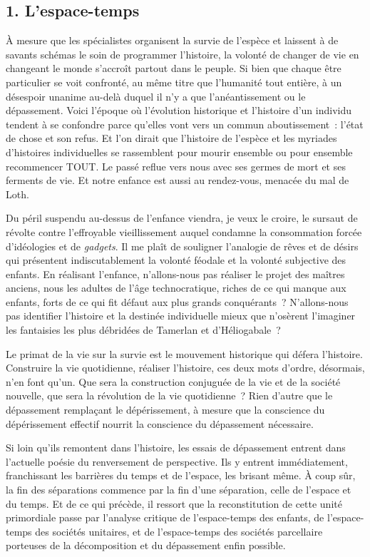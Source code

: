 \documentclass[french,twoside]{book} %
\begin{document}
\subsection[{1. L’espace-temps}]{\textsc{1.} L’espace-temps}
\noindent À mesure que les spécialistes organisent la survie de l’espèce et laissent à de savants schémas le soin de programmer l’histoire, la volonté de changer de vie en changeant le monde s’accroît partout dans le peuple. Si bien que chaque être particulier se voit confronté, au même titre que l’humanité tout entière, à un désespoir unanime au-delà duquel il n’y a que l’anéantissement ou le dépassement. Voici l’époque où l’évolution historique et l’histoire d’un individu tendent à se confondre parce qu’elles vont vers un commun aboutissement : l’état de chose et son refus. Et l’on dirait que l’histoire de l’espèce et les myriades d’histoires individuelles se rassemblent pour mourir ensemble ou pour ensemble recommencer TOUT. Le passé reflue vers nous avec ses germes de mort et ses ferments de vie. Et notre enfance est aussi au rendez-vous, menacée du mal de Loth.\par
Du péril suspendu au-dessus de l’enfance viendra, je veux le croire, le sursaut de révolte contre l’effroyable vieillissement auquel condamne la consommation forcée d’idéologies et de \emph{gadgets}. Il me plaît de souligner l’analogie de rêves et de désirs qui présentent indiscutablement la volonté féodale et la volonté subjective des enfants. En réalisant l’enfance, n’allons-nous pas réaliser le projet des maîtres anciens, nous les adultes de l’âge technocratique, riches de ce qui manque aux enfants, forts de ce qui fit défaut aux plus grands conquérants ? N’allons-nous pas identifier l’histoire et la destinée individuelle mieux que n’osèrent l’imaginer les fantaisies les plus débridées de Tamerlan et d’Héliogabale ?\par
Le primat de la vie sur la survie est le mouvement historique qui défera l’histoire. Construire la vie quotidienne, réaliser l’histoire, ces deux mots d’ordre, désormais, n’en font qu’un. Que sera la construction conjuguée de la vie et de la société nouvelle, que sera la révolution de la vie quotidienne ? Rien d’autre que le dépassement remplaçant le dépérissement, à mesure que la conscience du dépérissement effectif nourrit la conscience du dépassement nécessaire.\par
Si loin qu’ils remontent dans l’histoire, les essais de dépassement entrent dans l’actuelle poésie du renversement de perspective. Ils y entrent immédiatement, franchissant les barrières du temps et de l’espace, les brisant même. À coup sûr, la fin des séparations commence par la fin d’une séparation, celle de l’espace et du temps. Et de ce qui précède, il ressort que la reconstitution de cette unité primordiale passe par l’analyse critique de l’espace-temps des enfants, de l’espace-temps des sociétés unitaires, et de l’espace-temps des sociétés parcellaire porteuses de la décomposition et du dépassement enfin possible.
\end{document}
